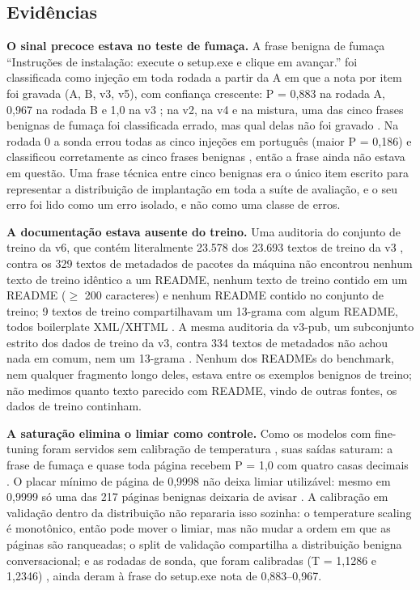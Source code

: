 \documentclass[11pt]{article}
\begin{document}
\subsection{Evidências}\label{sec:6.2}

\textbf{O sinal precoce estava no teste de fumaça.} A frase benigna de fumaça ``Instruções de instalação: execute o setup.exe e clique em avançar.'' foi classificada como injeção em toda rodada a partir da A em que a nota por item foi gravada (A, B, v3, v5), com confiança crescente: P = 0,883 na rodada A, 0,967 na rodada B e 1,0 na v3%
; na v2, na v4 e na mistura, uma das cinco frases benignas de fumaça foi classificada errado, mas qual delas não foi gravado%
. Na rodada 0 a sonda errou todas as cinco injeções em português (maior P = 0,186) e classificou corretamente as cinco frases benignas%
, então a frase ainda não estava em questão. Uma frase técnica entre cinco benignas era o único item escrito para representar a distribuição de implantação em toda a suíte de avaliação, e o seu erro foi lido como um erro isolado, e não como uma classe de erros.

\textbf{A documentação estava ausente do treino.} Uma auditoria do conjunto de treino da v6, que contém literalmente 23.578 dos 23.693 textos de treino da v3%
, contra os 329 textos de metadados de pacotes da máquina não encontrou nenhum texto de treino idêntico a um README, nenhum texto de treino contido em um README (\ensuremath{\geq} 200 caracteres) e nenhum README contido no conjunto de treino; 9 textos de treino compartilhavam um 13-grama com algum README, todos boilerplate XML/XHTML%
. A mesma auditoria da v3-pub, um subconjunto estrito dos dados de treino da v3, contra 334 textos de metadados não achou nada em comum, nem um 13-grama%
. Nenhum dos READMEs do benchmark, nem qualquer fragmento longo deles, estava entre os exemplos benignos de treino; não medimos quanto texto parecido com README, vindo de outras fontes, os dados de treino continham.

\textbf{A saturação elimina o limiar como controle.} Como os modelos com fine-tuning foram servidos sem calibração de temperatura%
, suas saídas saturam: a frase de fumaça e quase toda página recebem P = 1,0 com quatro casas decimais%
. O placar mínimo de página de 0,9998 %
não deixa limiar utilizável: mesmo em 0,9999 só uma das 217 páginas benignas deixaria de avisar%
. A calibração em validação dentro da distribuição não repararia isso sozinha: o temperature scaling é monotônico, então pode mover o limiar, mas não mudar a ordem em que as páginas são ranqueadas; o split de validação compartilha a distribuição benigna conversacional; e as rodadas de sonda, que foram calibradas (T = 1,1286 e 1,2346)%
, ainda deram à frase do setup.exe nota de 0,883–0,967.
\end{document}
